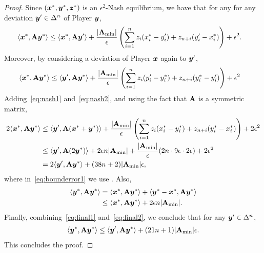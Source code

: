 \begin{proof}
    Since $({\bm{x}}^*, {\bm{y}}^*, {\bm{z}}^*)$ is an $\epsilon^2$-Nash equilibrium, we have that for any for any deviation ${\bm{y}}' \in \Delta^n$ of Player ${\bm{y}}$,
    \begin{align}
        \langle {\bm{x}}^*, \mathbf{A} {\bm{y}}^* \rangle & \leq \langle {\bm{x}}^*, \mathbf{A} {\bm{y}}' \rangle  + \frac{|\mathbf{A}_{\min}|}{\epsilon} \left(\sum_{i = 1}^n z_i (x^*_i - y'_i) + z_{n + i} (y'_i - x^*_i)\right) + \epsilon^2. \label{eq:nash1}
    \end{align}
    Moreover, by considering a deviation of Player ${\bm{x}}$ again to ${\bm{y}}'$,
    \begin{align}
        \langle {\bm{x}}^*, \mathbf{A} {\bm{y}}^* \rangle  & \leq \langle {\bm{y}}', \mathbf{A} {\bm{y}}^* \rangle  + \frac{|\mathbf{A}_{\min}|}{\epsilon} \left(\sum_{i = 1}^n z_i (y'_i - y^*_i) + z_{n + i} (y^*_i - y'
        _i)\right) + \epsilon^2 \label{eq:nash2}
    \end{align}
    Adding~\eqref{eq:nash1} and~\eqref{eq:nash2}, and using the fact that $\mathbf{A}$ is a symmetric matrix,
    \begin{align}
        2 \langle {\bm{x}}^*, \mathbf{A} {\bm{y}}^* \rangle  & \leq \langle {\bm{y}}', \mathbf{A} ({\bm{x}}^* + {\bm{y}}^*) \rangle + \frac{|\mathbf{A}_{\min}|}{\epsilon} \left(\sum_{i = 1}^n z_i (x^*_i - y^*_i) + z_{n + i} (y^*_i - x^*
        _i) \right) + 2 \epsilon^2 \notag \\
        & \leq \langle {\bm{y}}', \mathbf{A} (2 {\bm{y}}^*) \rangle  + 2\epsilon n |\mathbf{A}_{\min}| + \frac{|\mathbf{A}_{\min}|}{\epsilon} ( 2n\cdot 9 \epsilon \cdot 2\epsilon ) + 2\epsilon^2 \label{eq:bounderror1} \\
        &= 2 \langle {\bm{y}}', \mathbf{A} {\bm{y}}^* \rangle + (38 n + 2) |\mathbf{A}_{\min}| \epsilon, \label{eq:final1}
    \end{align}
    where in~\eqref{eq:bounderror1} we use . Also,
    \begin{align}
        \langle {\bm{y}}^*, \mathbf{A} {\bm{y}}^* \rangle & = \langle {\bm{x}}^*, \mathbf{A} {\bm{y}}^* \rangle + \langle {\bm{y}}^* - {\bm{x}}^*, \mathbf{A} {\bm{y}}^* \rangle \notag \\
        & \leq \langle {\bm{x}}^*, \mathbf{A} {\bm{y}}^* \rangle + 2 \epsilon n |\mathbf{A}_{\min}|. \label{eq:final2}
    \end{align}
    Finally, combining~\eqref{eq:final1} and~\eqref{eq:final2}, we conclude that for any ${\bm{y}}' \in \Delta^n$,
    \begin{align*}
        \langle {\bm{y}}^*, \mathbf{A} {\bm{y}}^* \rangle \leq \langle {\bm{y}}', \mathbf{A} {\bm{y}}^* \rangle  + (21 n + 1) |\mathbf{A}_{\min}|\epsilon.
    \end{align*}
    This concludes the proof.
\end{proof}

